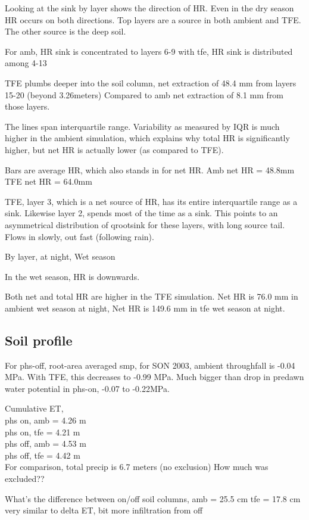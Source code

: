 \documentclass[draft,linenumbers]{agujournal}
\begin{document}
Looking at the sink by layer shows the direction of HR.
Even in the dry season HR occurs on both directions.
Top layers are a source in both ambient and TFE. The other source is the deep soil.

For amb, HR sink is concentrated to layers 6-9
with tfe, HR sink is distributed among 4-13

TFE plumbs deeper into the soil column, net extraction of 48.4 mm from layers 15-20 (beyond 3.26meters)
Compared to amb net extraction of 8.1 mm from those layers.

The lines span interquartile range. 
Variability as measured by IQR is much higher in the ambient simulation, which explains why total HR is significantly higher, 
but net HR is actually lower (as compared to TFE). 

Bars are average HR, which also stands in for net HR.
Amb net HR = 48.8mm 
TFE net HR = 64.0mm

TFE, layer 3, which is a net source of HR, has its entire interquartile range as a sink.
Likewise layer 2, spends most of the time as a sink.
This points to an asymmetrical distribution of qrootsink for these layers, with long source tail. Flows in slowly, out fast (following rain).

By layer, at night, Wet season

In the wet season, HR is downwards.

Both net and total HR are higher in the TFE simulation. 
Net HR is 76.0 mm in ambient wet season at night,
Net HR is 149.6 mm in tfe wet season at night.

\subsection{Soil profile}

For phs-off, root-area averaged smp, for SON 2003, ambient throughfall is -0.04 MPa.
With TFE, this decreases to -0.99 MPa. 
Much bigger than drop in predawn water potential in phs-on, -0.07 to -0.22MPa.

Cumulative ET, \\
phs on, amb = 4.26 m \\
phs on, tfe = 4.21 m \\
phs off, amb = 4.53 m \\
phs off, tfe = 4.42 m \\

For comparison, total precip is 6.7 meters (no exclusion)
How much was excluded??

What's the difference between on/off soil columns, 
amb = 25.5 cm
tfe = 17.8 cm
very similar to delta ET, bit more infiltration from off
\end{document}
